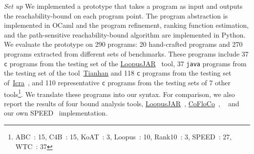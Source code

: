 \emph{Set up} We implemented a prototype {\THESYSTEM} that takes a program as input 
and outputs the reachability-bound on each program point.
The 
program abstraction is implemented in OCaml and the program refinement, ranking function estimation, and the path-sensitive reachability-bound algorithm are implemented in Python.
We evaluate the prototype on 290 programs: 20 hand-crafted programs and 270 programs extracted from different sets of benchmarks. 
These programs include  37 {\tt c} programs 
from the testing set of the \hyperlink{https://forsyte.at/static/people/sinn/loopusJAR/index.html}{LoopusJAR}~\cite{BenchmarkLoopus} tool,
37 {\tt java} programs from the testing set of the tool~\hyperlink{https://zenodo.org/record/5140586\#.Y5pBoC-B1QI}{Tianhan}\cite{BenchmarkTianhan,LuCT21} 
and 118 {\tt c} programs from the testing set of~\hyperlink{https://github.com/icra-team/icra}{Icra}~\cite{BenchmarkIcra,KincaidBCR19,CyphertBKR19}, and 110 representative {\tt c} programs from the testing sets of 7 other tools\footnote{ABC~\cite{BenchmarkABC}: 15, C4B~\cite{BenchmarkC4B}: 15, KoAT~\cite{BenchmarkKoAt}: 3, Loopus~\cite{BenchmarkLoopus}: 10, Rank10~\cite{BenchmarkRank}: 3, SPEED~\cite{GulwaniJK09,GulwaniZ10,GulwaniMC09}: 27, WTC~\cite{BenchmarkLoopus}: 37}.
%
We translate these programs into our syntax.
For comparison, we also report the results of four bound analysis tools, 
\hyperlink{https://forsyte.at/software/loopus/}{LoopusJAR}~\cite{SinnZV17},
\hyperlink{https://github.com/aeflores/CoFloCo/tree/master/src}{CoFloCo}~\cite{ToolCofloco},
~\cite{BenchmarkTianhan}
and our own SPEED~\cite{GulwaniJK09} implementation.

